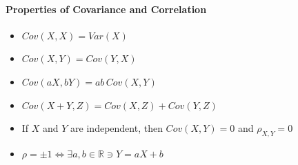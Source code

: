 \paragraph{Properties of Covariance and Correlation}
\begin{itemize}
    \item $Cov(X,X) = Var(X)$
    \item $Cov(X,Y) = Cov(Y,X)$
    \item $Cov(aX, bY) = ab \, Cov(X,Y)$
    \item $Cov(X + Y, Z) = Cov(X,Z) + Cov(Y,Z)$
    \item If $X$ and $Y$ are independent, then $Cov(X,Y) = 0$ and $\rho_{X,Y} = 0$
    \item $\rho = \pm 1 \iff \exists a, b \in \mathbb{R} \ni Y = aX+b$ 
\end{itemize}